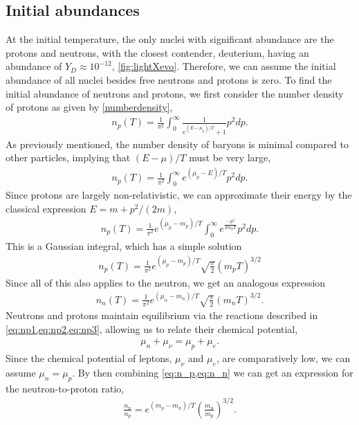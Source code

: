\subsection{Initial abundances}
At the initial temperature, the only nuclei with significant abundance are the protons and neutrons, with the closest contender, deuterium, having an abundance of $Y_D\approx 10^{-12}$, \cref{fig:lightXevo}. Therefore, we can assume the initial abundance of all nuclei besides free neutrons and protons is zero. To find the initial abundance of neutrons and protons, we first consider the number density of protons as given by \cref{numberdensity}, 
\begin{align}
    n_p(T)=\frac{1}{\pi^2}\int_{0}^{\infty}\frac{1}{e^{(E-\mu_p)/T}+1} p^2 dp.
\end{align}
As previously mentioned, the number density of baryons is minimal compared to other particles, implying that $(E-\mu)/T$ must be very large,
\begin{align}
    n_p(T)=\frac{1}{\pi^2}\int_{0}^{\infty}{e^{(\mu_p-E)/T}} p^2 dp.
\end{align}
Since protons are largely non-relativistic, we can approximate their energy by the classical expression $E=m+p^2/(2m)$, 
\begin{align}
    n_p(T)=\frac{1}{\pi^2}e^{(\mu_p-m_p)/T}\int_{0}^{\infty}{e^{\frac{-p^2}{2m_pT}}} p^2 dp.
\end{align}
This is a Gaussian integral, which has a simple solution\cite{griffiths_introduction_2018}
\begin{align}
    n_p(T)=\frac{1}{\pi^2} e^{(\mu_p-m_p)/T} \sqrt{\frac{\pi}{2}}\left( { m_p T} \right)^{3/2}
    \label{eq:n_p}
\end{align}
Since all of this also applies to the neutron, we get an analogous expression
\begin{align}
    n_n(T)=\frac{1}{\pi^2} e^{(\mu_n-m_n)/T} \sqrt{\frac{\pi}{2}}\left( { m_n T} \right)^{3/2}.
    \label{eq:n_n}
\end{align}
Neutrons and protons maintain equilibrium via the reactions described in \cref{eq:np1,eq:np2,eq:np3}, allowing us to relate their chemical potential,
\begin{align}
    \mu_n+\mu_\nu=\mu_p+\mu_e.
\end{align}
Since the chemical potential of leptons, $\mu_\nu$ and $\mu_e$, are comparatively low\cite{kolbturner}, we can assume $\mu_n=\mu_p$. By then combining \cref{eq:n_p,eq:n_n} we can get an expression for the neutron-to-proton ratio,
\begin{align}
    \frac{n_n}{n_p}=e^{(m_p-m_n)/T} \left( \frac{m_n}{ m_p} \right)^{3/2}.
    \label{eq:nnnp}
\end{align}
